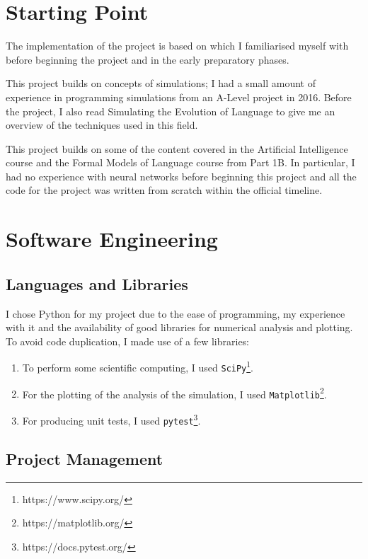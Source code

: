 \documentclass[12pt,a4paper]{report}
\begin{document}
\section{Starting Point}\label{section:starting}

The implementation of the project is based on \citet{Cangelosi1998} which I familiarised myself with before beginning the project and in the early preparatory phases.

This project builds on concepts of simulations; I had a small amount of experience in programming simulations from an A-Level project in 2016. Before the project, I also read Simulating the Evolution of Language \citep{Cangelosi2002} to give me an overview of the techniques used in this field. 

This project builds on some of the content covered in the Artificial Intelligence course and the Formal Models of Language course from Part 1B. In particular, I had no experience with neural networks before beginning this project and all the code for the project was written from scratch within the official timeline.

\section{Software Engineering}\label{section:software}

\subsection{Languages and Libraries}

I chose Python for my project due to the ease of programming, my experience with it and the availability of good libraries for numerical analysis and plotting. To avoid code duplication, I made use of a few libraries:

\begin{enumerate}
 	\item To perform some scientific computing, I used \verb|SciPy|\footnote{https://www.scipy.org/}.
	\item For the plotting of the analysis of the simulation, I used \verb|Matplotlib|\footnote{https://matplotlib.org/}. 
	\item For producing unit tests, I used \verb|pytest|\footnote{https://docs.pytest.org/}.
\end{enumerate}

\subsection{Project Management}
\end{document}
